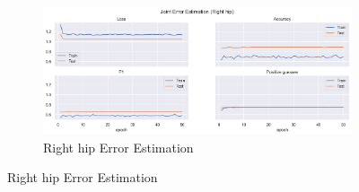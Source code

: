 \begin{figure}[!ht]
\begin{subfigure}[b]{0.47\linewidth}
  \end{subfigure}
  \hfill
  \begin{subfigure}[b]{0.47\linewidth}
      \centering
      \includegraphics[width=\textwidth]{figures/Results/v1/jt/Right hip_ErrorEstimation.png}
      \caption{Right hip Error Estimation}
      \label{fig:v1_rihi_jt_ee}
  \end{subfigure}
\end{figure}


